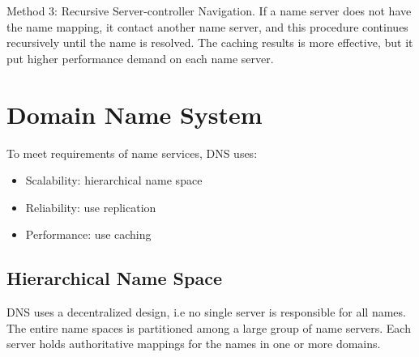 \begin{multicols*}{2}
\noindent Method 3: Recursive Server-controller Navigation. If a name server does not have the name mapping, it contact another name server, and this procedure continues recursively until the name is resolved. The caching results is more effective, but it put higher performance demand on each name server.

\section{Domain Name System}

\noindent To meet requirements of name services, DNS uses:
\begin{itemize}
  \item Scalability: hierarchical name space
  \item Reliability: use replication
  \item Performance: use caching
\end{itemize}

\subsection{Hierarchical Name Space}

\begin{center}
\end{center}

\noindent DNS uses a decentralized design, i.e no single server is responsible for all names. The entire name spaces is partitioned among a large group of name servers. Each server holds authoritative mappings for the names in one or more domains. \\


\end{multicols*}
